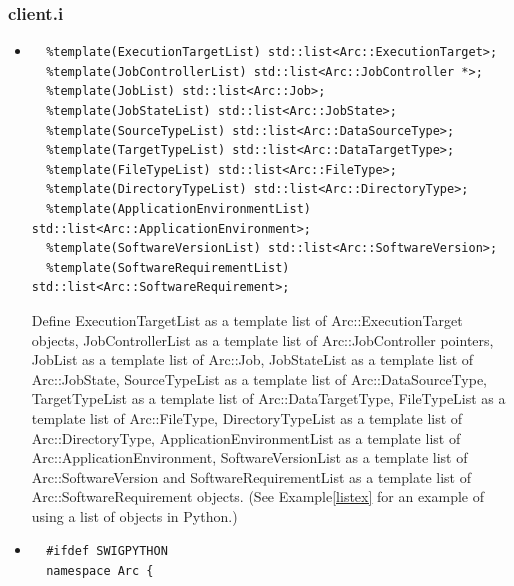 \documentclass{article}
\begin{document}
\subsubsection{client.i}
\label{iclient}
\begin{flushleft}
\begin{itemize}
  \item{ \begin{verbatim}
  %template(ExecutionTargetList) std::list<Arc::ExecutionTarget>;
  %template(JobControllerList) std::list<Arc::JobController *>;
  %template(JobList) std::list<Arc::Job>;
  %template(JobStateList) std::list<Arc::JobState>;
  %template(SourceTypeList) std::list<Arc::DataSourceType>;
  %template(TargetTypeList) std::list<Arc::DataTargetType>;
  %template(FileTypeList) std::list<Arc::FileType>;
  %template(DirectoryTypeList) std::list<Arc::DirectoryType>;
  %template(ApplicationEnvironmentList) std::list<Arc::ApplicationEnvironment>;
  %template(SoftwareVersionList) std::list<Arc::SoftwareVersion>;
  %template(SoftwareRequirementList) std::list<Arc::SoftwareRequirement>;
  \end{verbatim}
  }
  Define ExecutionTargetList as a template list of Arc::ExecutionTarget objects, 
  JobControllerList as a template list of Arc::JobController pointers, 
  JobList as a template list of Arc::Job, JobStateList as a template list of 
  Arc::JobState, SourceTypeList as a template list of Arc::DataSourceType, 
  TargetTypeList as a template list of Arc::DataTargetType, FileTypeList as a 
  template list of Arc::FileType, DirectoryTypeList as a template list of 
  Arc::DirectoryType, ApplicationEnvironmentList as a template list of 
  Arc::ApplicationEnvironment, SoftwareVersionList as a template list of 
  Arc::SoftwareVersion and SoftwareRequirementList as a template list of 
  Arc::SoftwareRequirement objects. \linebreak
  (See Example\ref{listex} for an example of using a list of objects in Python.)
\end{itemize}
\begin{itemize}
  \item{ \begin{verbatim}
  #ifdef SWIGPYTHON
  namespace Arc {


\end{verbatim}}
\end{itemize}
\end{flushleft}
\end{document}
